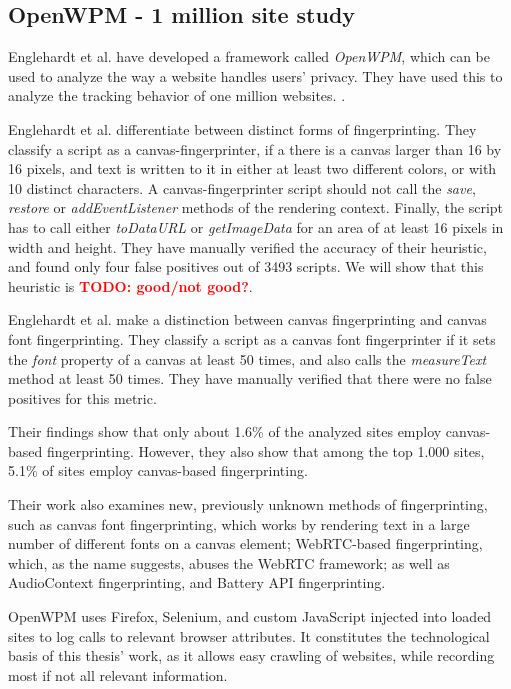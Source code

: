 \documentclass[
    fontsize=12pt,
    headings=small,
    parskip=half,
    bibliography=totoc,
    numbers=noenddot,
    open=any
    ]{scrreprt}
\newcommand{\todo}[1]{\textcolor{red}{\textbf{TODO: #1}}}
\begin{document}
\subsection{OpenWPM - 1 million site study}
\label{section:openwpm}
Englehardt et al. have developed a framework called \textit{OpenWPM}, which can be used to analyze the way a website
handles users' privacy. They have used this to analyze the tracking behavior of one million websites.
\cite{DBLP:conf/ccs/EnglehardtN16,englehardt2016census}.

Englehardt et al. differentiate between distinct forms of fingerprinting.
They classify a script as a canvas-fingerprinter, if a there is a canvas larger than 16 by 16 pixels, and text is
written to it in either at least two different colors, or with 10 distinct characters.
A canvas-fingerprinter script should not call the \textit{save}, \textit{restore} or \textit{addEventListener}
methods of the rendering context. Finally, the script has to call either \textit{toDataURL}
or \textit{getImageData} for an area of at least 16 pixels in width and height.
They have manually verified the accuracy of their heuristic, and found only four false positives
out of 3493 scripts.
We will show that this heuristic is \todo{good/not good?}.

Englehardt et al. make a distinction between canvas fingerprinting and canvas font fingerprinting.
They classify a script as a canvas font fingerprinter if it sets the \textit{font} property
of a canvas at least 50 times, and also calls the \textit{measureText} method at least 50 times.
They have manually verified that there were no false positives for this metric.

Their findings show that only about 1.6\% of the analyzed sites
employ canvas-based fingerprinting. However, they also show that among the top 1.000 sites,
5.1\% of sites employ canvas-based fingerprinting.

Their work also examines new, previously unknown methods of fingerprinting, such as canvas font fingerprinting, which
works by rendering text in a large number of different fonts on a canvas element; WebRTC-based fingerprinting, which,
as the name suggests, abuses the WebRTC framework; as well as AudioContext fingerprinting, and Battery API fingerprinting.

OpenWPM uses Firefox, Selenium, and custom JavaScript injected into loaded sites to log calls to relevant browser attributes.
It constitutes the technological basis of this thesis' work, as it allows easy crawling of websites, while recording
most if not all relevant information.
\end{document}
